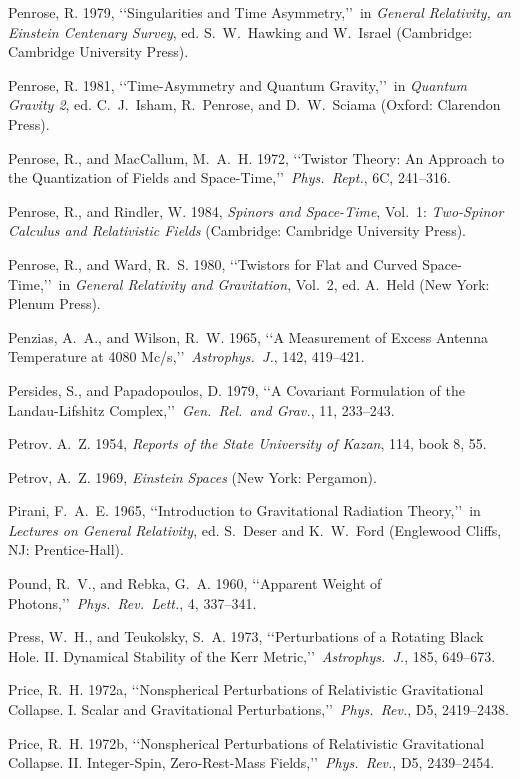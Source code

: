 \item Penrose, R. 1979, \lq\lq Singularities and Time Asymmetry,\rq\rq\ in \emph{General Relativity, an Einstein Centenary Survey}, ed. S.~W.~Hawking and W.~Israel (Cambridge: Cambridge University Press).
\item Penrose, R. 1981, \lq\lq Time-Asymmetry and Quantum Gravity,\rq\rq\ in \emph{Quantum Gravity 2}, ed. C.~J.~Isham, R.~Penrose, and D.~W.~Sciama (Oxford: Clarendon Press).
\item Penrose, R., and MacCallum, M.~A.~H. 1972, \lq\lq Twistor Theory: An Approach to the Quantization of Fields and Space-Time,\rq\rq\ \emph{Phys.\ Rept.}, 6C, 241--316.
\item Penrose, R., and Rindler, W. 1984, \emph{Spinors and Space-Time}, Vol.~1: \emph{Two-Spinor Calculus and Relativistic Fields} (Cambridge: Cambridge University Press).
\item Penrose, R., and Ward, R.~S. 1980, \lq\lq Twistors for Flat and Curved Space-Time,\rq\rq\ in \emph{General Relativity and Gravitation}, Vol.~2, ed. A.~Held (New York: Plenum Press).
\item Penzias, A.~A., and Wilson, R.~W. 1965, \lq\lq A Measurement of Excess Antenna Temperature at 4080 Mc/s,\rq\rq\ \emph{Astrophys.\ J.}, 142, 419--421.
\item Persides, S., and Papadopoulos, D. 1979, \lq\lq A Covariant Formulation of the Landau-Lifshitz Complex,\rq\rq\ \emph{Gen.\ Rel.\ and Grav.}, 11, 233--243.
\item Petrov. A.~Z. 1954, \emph{Reports of the State University of Kazan}, 114, book 8, 55.
\item Petrov, A.~Z. 1969, \emph{Einstein Spaces} (New York: Pergamon).
\item Pirani, F.~A.~E. 1965, \lq\lq Introduction to Gravitational Radiation Theory,\rq\rq\ in \emph{Lectures on General Relativity}, ed. S.~Deser and K.~W.~Ford (Englewood Cliffs, NJ: Prentice-Hall).
\item Pound, R.~V., and Rebka, G.~A. 1960, \lq\lq Apparent Weight of Photons,\rq\rq\ \emph{Phys.\ Rev.\ Lett.}, 4, 337--341.
\item Press, W.~H., and Teukolsky, S.~A. 1973, \lq\lq Perturbations of a Rotating Black Hole. II. Dynamical Stability of the Kerr Metric,\rq\rq\ \emph{Astrophys.\ J.}, 185, 649--673.
\item Price, R.~H. 1972a, \lq\lq Nonspherical Perturbations of Relativistic Gravitational Collapse. I. Scalar and Gravitational Perturbations,\rq\rq\ \emph{Phys.\ Rev.}, D5, 2419--2438.
\item Price, R.~H. 1972b, \lq\lq Nonspherical Perturbations of Relativistic Gravitational Collapse. II. Integer-Spin, Zero-Rest-Mass Fields,\rq\rq\ \emph{Phys.\ Rev.}, D5, 2439--2454.

